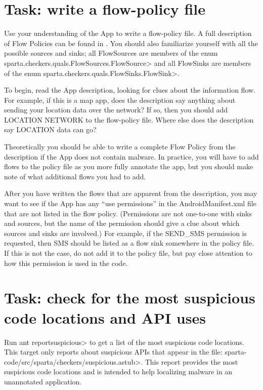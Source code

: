 \section{Task: write a flow-policy file}

Use your understanding of the App to write a flow-policy file.  A full description of Flow Policies can be 
found in .   You should also familiarize yourself with all the possible sources and sinks; 
 all FlowSources  are
members of the enum \<sparta.checkers.quals.FlowSources.FlowSource> and all FlowSinks are
members of the enum \<sparta.checkers.quals.FlowSinks.FlowSink>.

To begin, read the App description, looking for clues about the information flow.  For example,
if this is a map app, does the description say anything about sending your location data over the
 network?  If so, then you should add LOCATION \flowsto{} NETWORK to the flow-policy file.  Where
else does the description say LOCATION data can go?   

Theoretically you should be able to write a complete Flow Policy from the description 
if the App does not contain malware.  In practice, you will have to add flows to the policy file as you
 more fully annotate the app, but you should make note of what additional flows you had to add.
 
 After you have written the flows that are apparent from the description, you may want to see if the App
  has any ``use permissions'' in the AndroidManifest.xml file that are not listed in the flow policy. 
  (Permissions are not one-to-one with sinks and sources, but the name of the permission should give 
  a clue about which sources and sinks are involved.)  For example, if the SEND\_SMS permission is 
  requested, then SMS should be listed as a flow sink somewhere in the policy file.  If this is not the 
  case, do not add it to the policy file, but pay close attention to how this permission is used in the 
  code.

\section{Task: check for the most suspicious code locations and API uses}
\label{sec:appanalysis/suspicious}
Run \<ant reportsuspicious> to get a list of the most suspicious code
locations. 
This target only reports about suspicious APIs that appear 
in the file:
\<sparta-code/src/sparta/checkers/suspicious.astub>. This report
provides the most suspicious code locations and is intended to help
localizing malware in an unannotated application.

